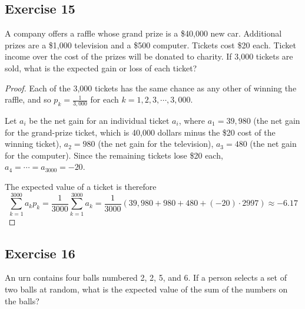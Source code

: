 \documentclass[14pt]{extarticle}
\begin{document}
\subsection{Exercise 15}
A company offers a raffle whose grand prize is a \$40,000 new car. Additional prizes are a \$1,000 television and a \$500
computer. Tickets cost \$20 each. Ticket income over the cost of the prizes will be donated to charity. If 3,000 tickets are
sold, what is the expected gain or loss of each ticket?

\begin{proof}
     Each of the 3,000 tickets has the same chance as any other of  winning the raffle, and so \(p_k = \frac{1}{3,000}\) for each
     \(k = 1, 2, 3, \cdots, 3,000\).

     Let \(a_i\) be the net gain for an individual ticket \(a_i\), where \(a_1 = 39,980\) (the net gain for the grand-prize
     ticket, which is 40,000 dollars minus the \$20 cost of the winning ticket), \(a_2 = 980\) (the net gain for the
     television), \(a_3 = 480\) (the net gain for the computer). Since the remaining tickets lose \$20 each, \(a_4 = \cdots =
     a_{3000} = -20\).

     The expected value of a ticket is therefore
     \[
          \sum_{k=1}^{3000}a_kp_k = \frac{1}{3000}\sum_{k=1}^{3000}a_k =  \frac{1}{3000}(39,980+980+480+(-20) \cdot 2997) \approx -6.17
     \]
\end{proof}

\subsection{Exercise 16}
An urn contains four balls numbered 2, 2, 5, and 6. If a person selects a set of two balls at random, what is the
expected value of the sum of the numbers on the balls?
\end{document}
